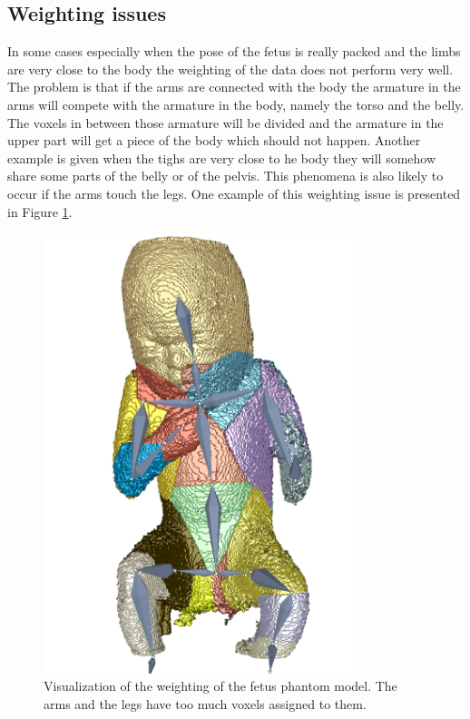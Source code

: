 \subsection{Weighting issues}

In some cases especially when the pose of the fetus is really packed and the limbs are very close to the body the weighting of the data does not perform very well. The problem is that if the arms are connected with the body the armature in the arms will compete with the armature in the body, namely the torso and the belly. The voxels in between those armature will be divided and the armature in the upper part will get a piece of the body which should not happen. Another example is given when the tighs are very close to he body they will somehow share some parts of the belly or of the pelvis. This phenomena is also likely to occur if the arms touch the legs. One example of this weighting issue is presented in Figure \ref{fig:weightingissue}.

\begin{figure} [htb!]
    \centering
	\includegraphics[width=9cm]{content/images/results/weightingIssues.png}
	\caption{Visualization of the weighting of the fetus phantom model. The arms and the legs have too much voxels assigned to them.}
	\label{fig:weightingissue}
\end{figure}

\newpage
